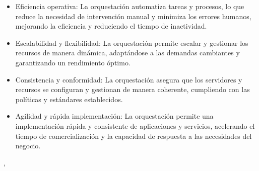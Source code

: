 \documentclass[12pt]{article}
\begin{document}
\begin{itemize}
\item Eficiencia operativa: La orquestación automatiza tareas y procesos, lo que reduce la necesidad de intervención manual y minimiza los errores humanos, mejorando la eficiencia y reduciendo el tiempo de inactividad.
 
\item Escalabilidad y flexibilidad: La orquestación permite escalar y gestionar los recursos de manera dinámica, adaptándose a las demandas cambiantes y garantizando un rendimiento óptimo.
 
\item Consistencia y conformidad: La orquestación asegura que los servidores y recursos se configuran y gestionan de manera coherente, cumpliendo con las políticas y estándares establecidos.
 
\item Agilidad y rápida implementación: La orquestación permite una implementación rápida y consistente de aplicaciones y servicios, acelerando el tiempo de comercialización y la capacidad de respuesta a las necesidades del negocio.
\end{itemize}
\cite{IBM}, \cite{HuaweiForum}
\end{document}

